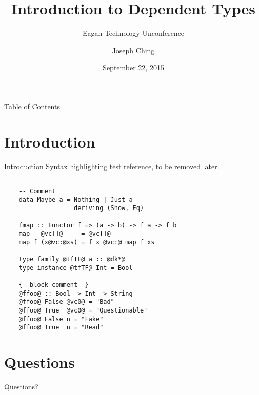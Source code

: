 \documentclass[xcolor={usenames,dvipsnames}]{beamer}
\title{Introduction to Dependent Types}
\subtitle{Eagan Technology Unconference}
\author{Joseph Ching}
\date{September 22, 2015}
\begin{document}
\begin{frame}[plain]
  \titlepage
\end{frame}


\begin{frame}{Table of Contents}
  \tableofcontents[pausesections]
\end{frame}


\section{Introduction}

\begin{frame}[fragile]{Introduction}
  Syntax highlighting test reference, to be removed later.

  \begin{lstlisting}[style=hask]

    -- Comment
    data Maybe a = Nothing | Just a
                   deriving (Show, Eq)

    fmap :: Functor f => (a -> b) -> f a -> f b
    map _ @vc[]@     = @vc[]@
    map f (x@vc:@xs) = f x @vc:@ map f xs

    type family @tfTF@ a :: @dk*@
    type instance @tfTF@ Int = Bool

    {- block comment -}
    @ffoo@ :: Bool -> Int -> String
    @ffoo@ False @vc0@ = "Bad"
    @ffoo@ True  @vc0@ = "Questionable"
    @ffoo@ False n = "Fake"
    @ffoo@ True  n = "Read"
  \end{lstlisting}
\end{frame}

\begin{frame}[fragile]
\end{frame}


\section{Questions}

\begin{frame}
  Questions?
\end{frame}
\end{document}
